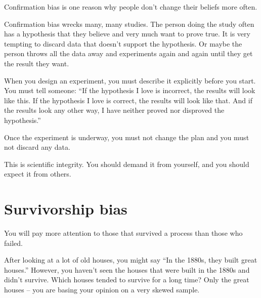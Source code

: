 Confirmation bias is one reason why people don't change their beliefs
more often.

Confirmation bias wrecks many, many studies. The person doing the
study often has a hypothesis that they believe and very much want to
prove true. It is very tempting to discard data that doesn't support
the hypothesis. Or maybe the person throws all the data away and experiments again and again until they get the result they want.

When you design an experiment, you must describe it explicitly before
you start. You must tell someone: ``If the hypothesis I love is
incorrect, the results will look like this.  If the hypothesis I love
is correct, the results will look like that. And if the results look
any other way, I have neither proved nor disproved the hypothesis.''

Once the experiment is underway, you must not change the plan and you
must not discard any data.

This is scientific integrity. You should demand it from yourself, and
you should expect it from others.

\section{Survivorship bias}

You will pay more attention to those that survived a process than
those who failed.

After looking at a lot of old houses, you might say ``In the 1880s,
they built great houses.'' However, you haven't seen the houses that
were built in the 1880s and didn't survive. Which houses tended to
survive for a long time? Only the great houses -- you are
basing your opinion on a very skewed sample.

